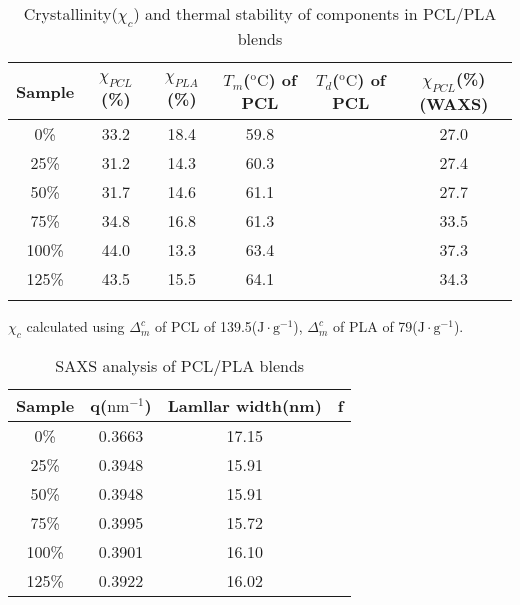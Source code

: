 \documentclass{Head}
\begin{document}
\begin{table}
    \caption{Crystallinity($\chi_c$) and thermal stability of components in PCL/PLA blends}
    \begin{tabular}{cccccc}
        \toprule
        Sample & $\chi_{PCL}$ (\%) & $\chi_{PLA}$(\%) & $T_m$($\mathrm{^o C}$) of PCL & $T_d$($\mathrm{^o C}$) of PCL & $\chi_{PCL}$(\%)(WAXS) \\
        \midrule
        0\%    & 33.2              & 18.4             & 59.8                          &                               & 27.0                   \\
        25\%   & 31.2              & 14.3             & 60.3                          &                               & 27.4                   \\
        50\%   & 31.7              & 14.6             & 61.1                          &                               & 27.7                   \\
        75\%   & 34.8              & 16.8             & 61.3                          &                               & 33.5                   \\
        100\%  & 44.0              & 13.3             & 63.4                          &                               & 37.3                   \\
        125\%  & 43.5              & 15.5             & 64.1                          &                               & 34.3                   \\
        \bottomrule
        \label{DSC_result_table}
    \end{tabular}

    $\chi_c $ calculated using $\Delta_m^c$ of PCL of 139.5($\mathrm{J\cdot g^{-1}}$), $\Delta_m^c$ of PLA of 79($\mathrm{J\cdot g^{-1}}$).
\end{table}
\begin{table}
    \centering
    \caption{SAXS analysis of PCL/PLA blends}
    \begin{tabular}{cccc}
        \toprule
        Sample & \textbf{q}($\mathrm{nm^{-1}}$) & Lamllar width(nm) & f \\
        \midrule
        0\%    & 0.3663                         & 17.15             &   \\
        25\%   & 0.3948                         & 15.91             &   \\
        50\%   & 0.3948                         & 15.91             &   \\
        75\%   & 0.3995                         & 15.72             &   \\
        100\%  & 0.3901                         & 16.10             &   \\
        125\%  & 0.3922                         & 16.02             &   \\
        \bottomrule
    \end{tabular}
\end{table}
\end{document}
